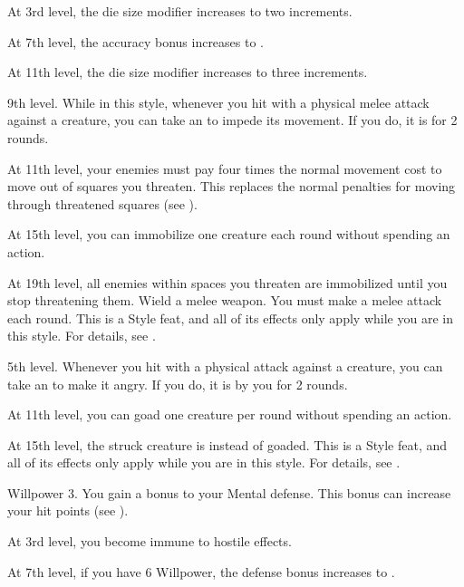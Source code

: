     At 3rd level, the die size modifier increases to two increments.

    At 7th level, the accuracy bonus increases to .

    At 11th level, the die size modifier increases to three increments.

    \featpre 9th level.
    \featben While in this style, whenever you hit with a physical melee attack against a creature, you can take an  to impede its movement.
    If you do, it is \immobilized for 2 rounds.

    At 11th level, your enemies must pay four times the normal movement cost to move out of squares you threaten.
    This replaces the normal penalties for moving through threatened squares (see ).

    At 15th level, you can immobilize one creature each round without spending an action.

    At 19th level, all enemies within spaces you threaten are immobilized until you stop threatening them.
    \stylereq Wield a melee weapon.
    You must make a melee attack each round.
     This is a Style feat, and all of its effects only apply while you are in this style.
    For details, see .

    \featpre 5th level.
    \featben Whenever you hit with a physical attack against a creature, you can take an  to make it angry.
    If you do, it is \goaded by you for 2 rounds.

    At 11th level, you can goad one creature per round without spending an action.

    At 15th level, the struck creature is \taunted instead of goaded.
     This is a Style feat, and all of its effects only apply while you are in this style.
    For details, see .

    \featpre Willpower 3.
    \featben You gain a  bonus to your Mental defense.
    This bonus can increase your hit points (see ).

    At 3rd level, you become immune to hostile  effects.

    At 7th level, if you have 6 Willpower, the defense bonus increases to .

